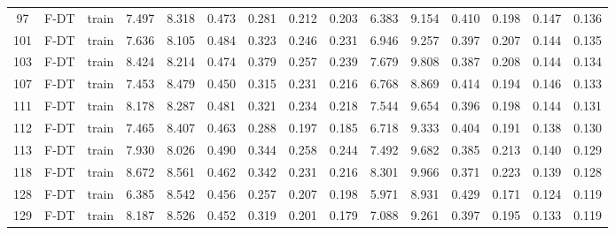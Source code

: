 \begin{table}
\begin{tabular}{@{\hskip3pt}c@{\hskip3pt}c@{\hskip3pt}c@{\hskip3pt}c@{\hskip3pt}c@{\hskip3pt}c@{\hskip3pt}c@{\hskip3pt}c@{\hskip3pt}c@{\hskip3pt}c@{\hskip3pt}c@{\hskip3pt}c@{\hskip3pt}c@{\hskip3pt}c@{\hskip3pt}c}
         97 &           F-DT &                     train &             7.497 &       8.318 &         0.473 &       0.281 &       0.212 &        0.203 &               6.383 &       9.154 &         0.410 &       0.198 &       0.147 &        0.136 \\
        101 &           F-DT &                     train &             7.636 &       8.105 &         0.484 &       0.323 &       0.246 &        0.231 &               6.946 &       9.257 &         0.397 &       0.207 &       0.144 &        0.135 \\
        103 &           F-DT &                     train &             8.424 &       8.214 &         0.474 &       0.379 &       0.257 &        0.239 &               7.679 &       9.808 &         0.387 &       0.208 &       0.144 &        0.134 \\
        107 &           F-DT &                     train &             7.453 &       8.479 &         0.450 &       0.315 &       0.231 &        0.216 &               6.768 &       8.869 &         0.414 &       0.194 &       0.146 &        0.133 \\
        111 &           F-DT &                     train &             8.178 &       8.287 &         0.481 &       0.321 &       0.234 &        0.218 &               7.544 &       9.654 &         0.396 &       0.198 &       0.144 &        0.131 \\
        112 &           F-DT &                     train &             7.465 &       8.407 &         0.463 &       0.288 &       0.197 &        0.185 &               6.718 &       9.333 &         0.404 &       0.191 &       0.138 &        0.130 \\
        113 &           F-DT &                     train &             7.930 &       8.026 &         0.490 &       0.344 &       0.258 &        0.244 &               7.492 &       9.682 &         0.385 &       0.213 &       0.140 &        0.129 \\
        118 &           F-DT &                     train &             8.672 &       8.561 &         0.462 &       0.342 &       0.231 &        0.216 &               8.301 &       9.966 &         0.371 &       0.223 &       0.139 &        0.128 \\
        128 &           F-DT &                     train &             6.385 &       8.542 &         0.456 &       0.257 &       0.207 &        0.198 &               5.971 &       8.931 &         0.429 &       0.171 &       0.124 &        0.119 \\
        129 &           F-DT &                     train &             8.187 &       8.526 &         0.452 &       0.319 &       0.201 &        0.179 &               7.088 &       9.261 &         0.397 &       0.195 &       0.133 &        0.119 \\

\end{tabular}
\end{table}

